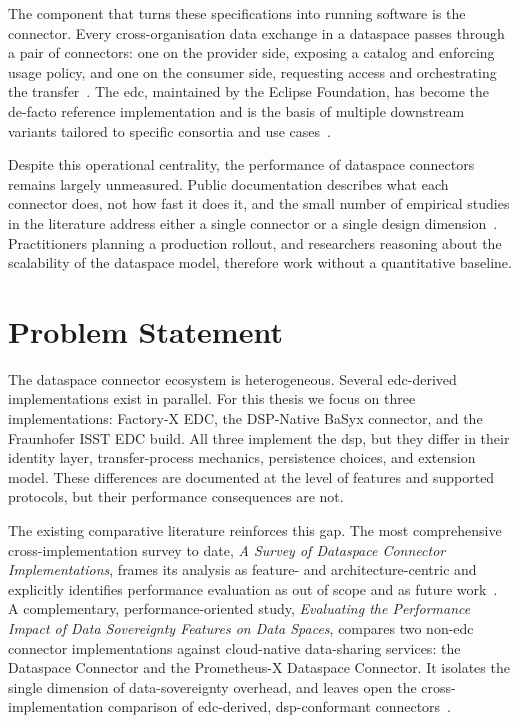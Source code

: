 The component that turns these specifications into running software is the connector. Every cross-organisation data exchange in a dataspace passes through a pair of connectors: one on the provider side, exposing a catalog and enforcing usage policy, and one on the consumer side, requesting access and orchestrating the transfer~\citep{dam2024surveydataspaceconnectorimplementations}. The \gls{edc}, maintained by the Eclipse Foundation, has become the de-facto reference implementation and is the basis of multiple downstream variants tailored to specific consortia and use cases~\citep{dam2024surveydataspaceconnectorimplementations}.

Despite this operational centrality, the performance of dataspace connectors remains largely unmeasured. Public documentation describes what each connector does, not how fast it does it, and the small number of empirical studies in the literature address either a single connector or a single design dimension~\citep{evaluatingtheperformanceimpactofdatasovereignty, dam2024surveydataspaceconnectorimplementations}. Practitioners planning a production rollout, and researchers reasoning about the scalability of the dataspace model, therefore work without a quantitative baseline.


\section{Problem Statement}\label{sec:problem-statement}

The dataspace connector ecosystem is heterogeneous. Several \gls{edc}-derived implementations exist in parallel. For this thesis we focus on three implementations: Factory-X EDC, the DSP-Native BaSyx connector, and the Fraunhofer ISST EDC build. All three implement the \gls{dsp}, but they differ in their identity layer, transfer-process mechanics, persistence choices, and extension model. These differences are documented at the level of features and supported protocols, but their performance consequences are not.

The existing comparative literature reinforces this gap. The most comprehensive cross-implementation survey to date, \emph{A Survey of Dataspace Connector Implementations}, frames its analysis as feature- and architecture-centric and explicitly identifies performance evaluation as out of scope and as future work~\citep{dam2024surveydataspaceconnectorimplementations}. A complementary, performance-oriented study, \emph{Evaluating the Performance Impact of Data Sovereignty Features on Data Spaces}, compares two non-\gls{edc} connector implementations against cloud-native data-sharing services: the Dataspace Connector and the Prometheus-X Dataspace Connector. It isolates the single dimension of data-sovereignty overhead, and leaves open the cross-implementation comparison of \gls{edc}-derived, \gls{dsp}-conformant connectors~\citep{evaluatingtheperformanceimpactofdatasovereignty}.

